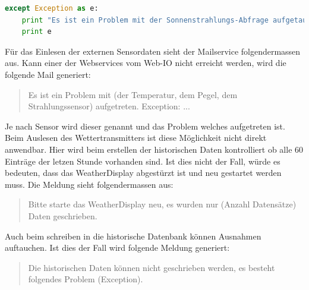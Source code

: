 \begin{lstlisting}[label=lst:printfunction,caption=Beispiel für print Funktion, language=Python, style=py]
except Exception as e:
    print "Es ist ein Problem mit der Sonnenstrahlungs-Abfrage aufgetaucht: "
    print e
\end{lstlisting}

Für das Einlesen der externen Sensordaten sieht der Mailservice folgendermassen aus. Kann einer der Webservices vom Web-IO nicht erreicht werden, wird die folgende Mail generiert:

\begin{quote}
Es ist ein Problem mit (der Temperatur, dem Pegel, dem Strahlungssensor) aufgetreten. Exception: ...\\
\end{quote}

Je nach Sensor wird dieser genannt und das Problem welches aufgetreten ist. Beim Auslesen des Wettertransmitters ist diese Möglichkeit nicht direkt anwendbar. Hier wird beim erstellen der historischen Daten kontrolliert ob alle 60 Einträge der letzen Stunde vorhanden sind. Ist dies nicht der Fall, würde es bedeuten, dass das WeatherDisplay abgestürzt ist und neu gestartet werden muss. Die Meldung sieht folgendermassen aus:\\

\begin{quote}
Bitte starte das WeatherDisplay neu, es wurden nur (Anzahl Datensätze) Daten geschrieben.
\end{quote}

Auch beim schreiben in die historische Datenbank können Ausnahmen auftauchen. Ist dies der Fall wird folgende Meldung generiert:\\

\begin{quote}
Die historischen Daten können nicht geschrieben werden, es besteht folgendes Problem (Exception).
\end{quote}
